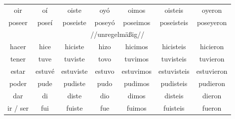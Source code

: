 \begin{tabular}{ccccccc}
oir & oí & oiste & oyó & oimos & oisteis & oyeron \\
poseer & poseí & poseiste & poseyó & poseimos & poseisteis & poseyeron \\
\hline
\multicolumn{7}{c}{//unregelmäßig//} \\
\hline
hacer & hice & hiciste & hizo & hicimos & hicisteis & hicieron \\
tener & tuve & tuviste & tovo & tuvimos & tuvisteis & tuvieron \\
estar & estuvé & estuviste & estuvo & estuvimos & estuvisteis & estuvieron \\
poder & pude & pudiste & pudo & pudimos & pudisteis & pudieron \\
dar & di & diste & dio & dimos & disteis & dieron \\
ir / ser & fui & fuiste & fue & fuimos & fuisteis & fueron \\
\hline
\end{tabular}

